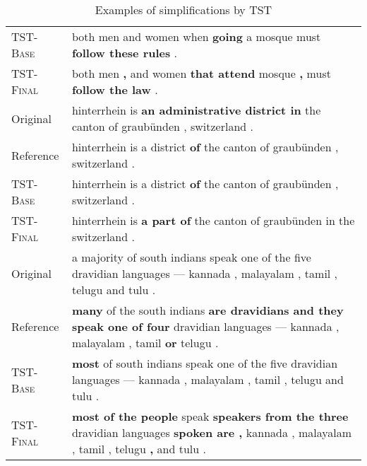 \documentclass[11pt,a4paper]{article}
\begin{document}
\begin{table*}[t]
{\begin{tabular}{p{1.9cm}|p{18cm}}
        \textsc{TST-Base} & both men and women when \textbf{going} a mosque must \textbf{follow these rules} . \\
        \textsc{TST-Final} & both men \textbf{,} and women \textbf{that attend} mosque \textbf{,} must \textbf{follow the law} . \\
        \midrule
        Original & hinterrhein is \textbf{an administrative district in} the canton of graubünden , switzerland . \\
        Reference & hinterrhein is a district \textbf{of} the canton of graubünden , switzerland . \\
        \textsc{TST-Base} & hinterrhein is a district \textbf{of} the canton of graubünden , switzerland . \\
        \textsc{TST-Final} & hinterrhein is \textbf{a part of} the canton of graubünden in the switzerland . \\
        \midrule        
        Original & a majority of south indians speak one of the five dravidian languages — kannada , malayalam , tamil , telugu and tulu . \\
        Reference & \textbf{many} of the south indians \textbf{are dravidians and they speak one of four} dravidian languages — kannada , malayalam , tamil \textbf{or} telugu . \\
        \textsc{TST-Base} & \textbf{most} of south indians speak one of the five dravidian languages — kannada , malayalam , tamil , telugu and tulu . \\
        \textsc{TST-Final} & \textbf{most of the people} speak \textbf{speakers from the three} dravidian languages \textbf{spoken are ,} kannada , malayalam , tamil , telugu \textbf{,} and tulu . \\
        
        \bottomrule
    \end{tabular}
}
\caption{Examples of simplifications by TST}
\label{tab:examples}
\end{table*}
\end{document}
